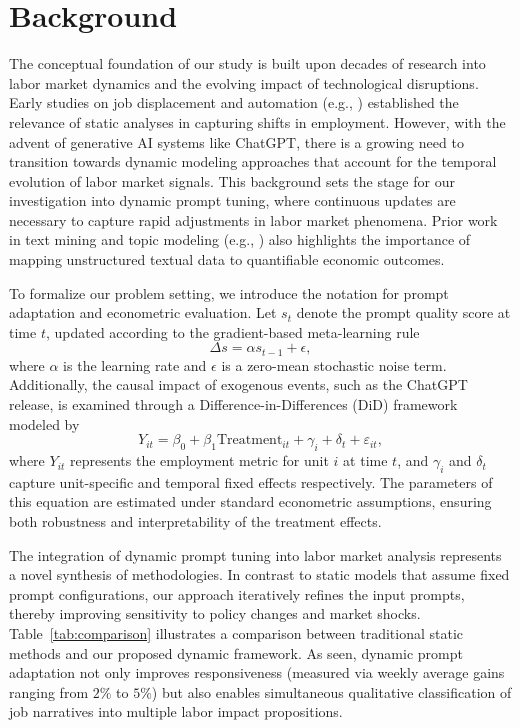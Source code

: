 \documentclass{article} %
\begin{document}
\section{Background}
The conceptual foundation of our study is built upon decades of research into labor market dynamics and the evolving impact of technological disruptions. Early studies on job displacement and automation (e.g., \cite{liu2023generate}) established the relevance of static analyses in capturing shifts in employment. However, with the advent of generative AI systems like ChatGPT, there is a growing need to transition towards dynamic modeling approaches that account for the temporal evolution of labor market signals. This background sets the stage for our investigation into dynamic prompt tuning, where continuous updates are necessary to capture rapid adjustments in labor market phenomena. Prior work in text mining and topic modeling (e.g., \cite{ahmadi2024generativeaiimpactlabor}) also highlights the importance of mapping unstructured textual data to quantifiable economic outcomes.

To formalize our problem setting, we introduce the notation for prompt adaptation and econometric evaluation. Let \(s_t\) denote the prompt quality score at time \(t\), updated according to the gradient-based meta-learning rule 
\[
\Delta s = \alpha s_{t-1} + \epsilon,
\]
where \(\alpha\) is the learning rate and \(\epsilon\) is a zero-mean stochastic noise term. Additionally, the causal impact of exogenous events, such as the ChatGPT release, is examined through a Difference-in-Differences (DiD) framework modeled by
\[
Y_{it} = \beta_0 + \beta_1 \text{Treatment}_{it} + \gamma_i + \delta_t + \varepsilon_{it},
\]
where \(Y_{it}\) represents the employment metric for unit \(i\) at time \(t\), and \(\gamma_i\) and \(\delta_t\) capture unit-specific and temporal fixed effects respectively. The parameters of this equation are estimated under standard econometric assumptions, ensuring both robustness and interpretability of the treatment effects.

The integration of dynamic prompt tuning into labor market analysis represents a novel synthesis of methodologies. In contrast to static models that assume fixed prompt configurations, our approach iteratively refines the input prompts, thereby improving sensitivity to policy changes and market shocks. Table~\ref{tab:comparison} illustrates a comparison between traditional static methods and our proposed dynamic framework. As seen, dynamic prompt adaptation not only improves responsiveness (measured via weekly average gains ranging from \(2\%\) to \(5\%\)) but also enables simultaneous qualitative classification of job narratives into multiple labor impact propositions.
\end{document}

